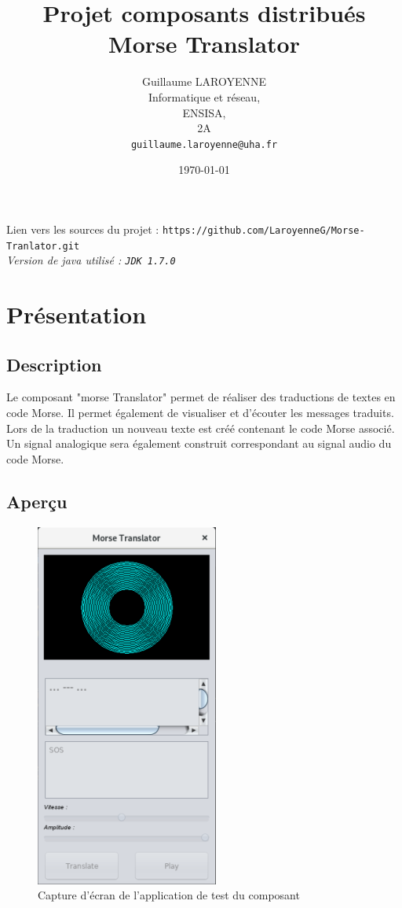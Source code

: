 \documentclass[a4paper,11pt]{article}
\title{\LARGE{Projet composants distribués}\\\bigskip \textbf{Morse Translator}}
\author{Guillaume LAROYENNE\\
   Informatique et réseau,\\
   ENSISA,\\
   2A\\
   \bigskip
   \texttt{guillaume.laroyenne@uha.fr}
   }
\date{\today}
\begin{document}
  \maketitle
  \begin{center}
  \large{Lien vers les sources du projet :} \texttt{https://github.com/LaroyenneG/Morse-Tranlator.git}\\[2cm]
  \textit{Version de java utilisé : \texttt{JDK 1.7.0}}
  \end{center}

  
      
  \newpage

\tableofcontents

\newpage

	\section{Présentation}
	\subsection{Description}
	Le composant "morse Translator" permet de réaliser des traductions de textes en code Morse. Il permet également de visualiser et d'écouter les messages traduits.
	Lors de la traduction un nouveau texte est créé contenant le code Morse associé. Un signal analogique sera également construit correspondant au signal audio du code Morse.  
	
	
    \subsection{Aperçu}
    \begin{figure}[H]
    	\begin{center}
    		\includegraphics[scale=0.9]{descpicture.png}
    		\caption{Capture d'écran de l'application de test du composant}
    		\label{Capture d'écran de l'application de test du composant}
    	\end{center}
    \end{figure}
    
\end{document}
